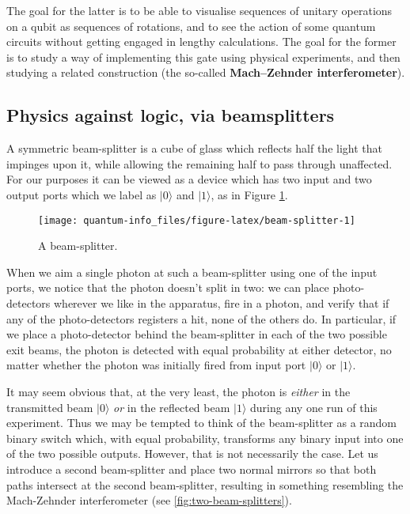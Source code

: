 \documentclass[fleqn]{article}
\begin{document}
The goal for the latter is to be able to visualise sequences of unitary operations on a qubit as sequences of rotations, and to see the action of some quantum circuits without getting engaged in lengthy calculations.
The goal for the former is to study a way of implementing this gate using physical experiments, and then studying a related construction (the so-called \textbf{Mach--Zehnder interferometer}).

\hypertarget{physics-against-logic-via-beamsplitters}{%
\subsection{Physics against logic, via beamsplitters}\label{physics-against-logic-via-beamsplitters}}

A symmetric beam-splitter is a cube of glass which reflects half the light that impinges upon it, while allowing the remaining half to pass through unaffected.
For our purposes it can be viewed as a device which has two input and two output ports which we label as \(|0\rangle\) and \(|1\rangle\), as in Figure \ref{fig:beam-splitter}.

\begin{figure}[H]

{\centering \texttt{[image: quantum-info\_files/figure-latex/beam-splitter-1]} 

}

\caption{A beam-splitter.}\label{fig:beam-splitter}
\end{figure}

When we aim a single photon at such a beam-splitter using one of the input ports, we notice that the photon doesn't split in two: we can place photo-detectors wherever we like in the apparatus, fire in a photon, and verify that if any of the photo-detectors registers a hit, none of the others do.
In particular, if we place a photo-detector behind the beam-splitter in each of the two possible exit beams, the photon is detected with equal probability at either detector, no matter whether the photon was initially fired from input port \(|0\rangle\) or \(|1\rangle\).

It may seem obvious that, at the very least, the photon is \emph{either} in the transmitted beam \(|0\rangle\) \emph{or} in the reflected beam \(|1\rangle\) during any one run of this experiment.
Thus we may be tempted to think of the beam-splitter as a random binary switch which, with equal probability, transforms any binary input into one of the two possible outputs.
However, that is not necessarily the case.
Let us introduce a second beam-splitter and place two normal mirrors so that both paths intersect at the second beam-splitter, resulting in something resembling the Mach-Zehnder interferometer (see \ref{fig:two-beam-splitters}).
\end{document}
